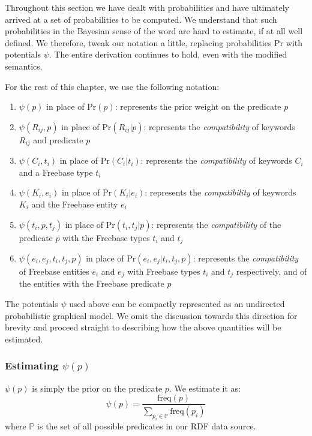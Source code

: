 \documentclass[a4paper, twoside, 12pt]{report}
\begin{document}
Throughout this section we have dealt with probabilities and have ultimately arrived at a set of probabilities to be computed. We understand that such probabilities in the Bayesian sense of the word are hard to estimate, if at all well defined. We therefore, tweak our notation a little, replacing probabilities $\text{Pr}$ with potentials $\psi$. The entire derivation continues to hold, even with the modified semantics.

For the rest of this chapter, we use the following notation:
\begin{enumerate}
  \item $\psi(p)$ in place of $\text{Pr}(p)$: represents the prior weight on the predicate $p$
  \item $\psi(R_{ij}, p)$ in place of $\text{Pr}(R_{ij}|p)$: represents the \emph{compatibility} of keywords $R_{ij}$ and predicate $p$
  \item $\psi(C_i, t_i)$ in place of $\text{Pr}(C_i|t_i)$: represents the \emph{compatibility} of keywords $C_i$ and a Freebase type $t_i$
  \item $\psi(K_i, e_i)$ in place of $\text{Pr}(K_i|e_i)$: represents the \emph{compatibility} of keywords $K_i$ and the Freebase entity $e_i$
  \item $\psi(t_i, p, t_j)$ in place of $\text{Pr}(t_i, t_j|p)$: represents the \emph{compatibility} of the predicate $p$ with the Freebase types $t_i$ and $t_j$
  \item $\psi(e_i, e_j, t_i, t_j, p)$ in place of $\text{Pr}(e_i, e_j | t_i, t_j, p)$: represents the \emph{compatibility} of Freebase entities $e_i$ and $e_j$ with Freebase types $t_i$ and $t_j$ respectively, and of the entities with the Freebase predicate $p$
\end{enumerate}

The potentials $\psi$ used above can be compactly represented as an undirected probabilistic graphical model. We omit the discussion towards this direction for brevity and proceed straight to describing how the above quantities will be estimated.

\subsubsection{Estimating $\psi(p)$}
$\psi(p)$ is simply the prior on the predicate $p$. We estimate it as:
$$\psi(p) = \frac{\text{freq}(p)}{\sum_{p_i \in \mathbb{P}}\text{freq}(p_i)}$$
where $\mathbb{P}$ is the set of all possible predicates in our RDF data source.
\end{document}
